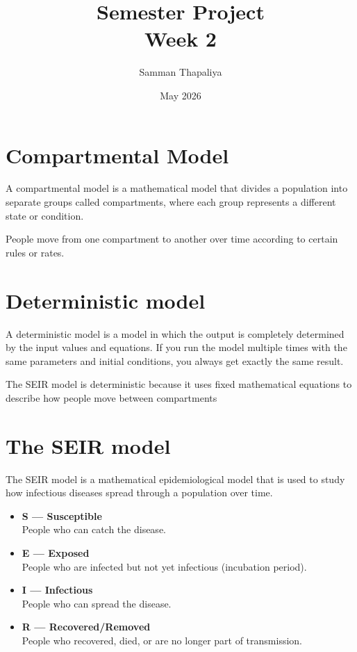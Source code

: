 \documentclass{article}
\title{Semester Project \\ \large Week 2}
\author{Samman Thapaliya}
\date{May 2026}
\begin{document}
\maketitle

\section{Compartmental Model}
A compartmental model is a mathematical model that divides a population into separate groups called compartments, where each group represents a different state or condition.

People  move from one compartment to another over time according to certain rules or rates.

\section{Deterministic model}
A deterministic model is a model in which the output is completely determined by the input values and equations. If you run the model multiple times with the same parameters and initial conditions, you always get exactly the same result.

The SEIR model is deterministic because it uses fixed mathematical equations to describe how people move between compartments

\section{The SEIR model}
The SEIR model  is a mathematical epidemiological model that is used to study how infectious diseases spread through a population over time.
\begin{itemize}
    \item \textbf{S --- Susceptible} \\
    People who can catch the disease.

    \item \textbf{E --- Exposed} \\
    People who are infected but not yet infectious (incubation period).

    \item \textbf{I --- Infectious} \\
    People who can spread the disease.

    \item \textbf{R --- Recovered/Removed} \\
    People who recovered, died, or are no longer part of transmission.
\end{itemize}
\end{document}
